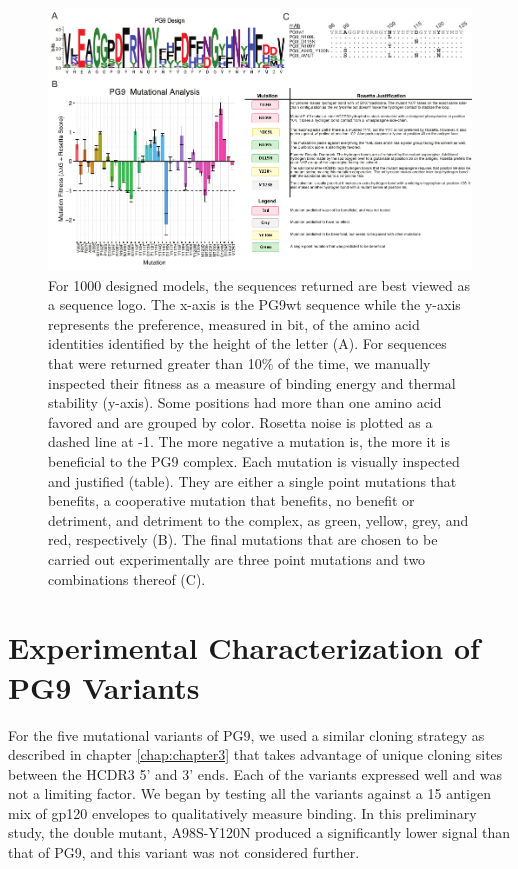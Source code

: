 \begin{figure}[!t]
   \centering
   \includegraphics[scale=1.5,width=.99\textwidth]{images/chapter4/figure4_3.pdf} %
   \caption[Redesign of PG9 HCDR3]{For 1000 designed models, the sequences returned are best viewed as a sequence logo. The x-axis is the PG9wt sequence while the y-axis represents the preference, measured in bit, of the amino acid identities identified by the height of the letter (A). For sequences that were returned greater than 10\% of the time, we manually inspected their fitness as a measure of binding energy and thermal stability (y-axis). Some positions had more than one amino acid favored and are grouped by color. Rosetta noise is plotted as a dashed line at -1. The more negative a mutation is, the more it is beneficial to the PG9 complex. Each mutation is visually inspected and justified (table). They are either a single point mutations that benefits, a cooperative mutation that benefits, no benefit or detriment, and detriment to the complex, as green, yellow, grey, and red, respectively (B). The final mutations that are chosen to be carried out experimentally are three point mutations and two combinations thereof (C).}
   \label{fig:figure4_3}
\end{figure} 


\section{Experimental Characterization of PG9 Variants}
For the five mutational variants of PG9, we used a similar cloning strategy as described in chapter \ref{chap:chapter3} that takes advantage of unique cloning sites between the HCDR3 5' and 3' ends. Each of the variants expressed well and was not a limiting factor. We began by testing all the variants against a 15 antigen mix of gp120 envelopes to qualitatively measure binding. In this preliminary study, the double mutant, A98S-Y120N produced a significantly lower signal than that of PG9, and this variant was not considered further. 


